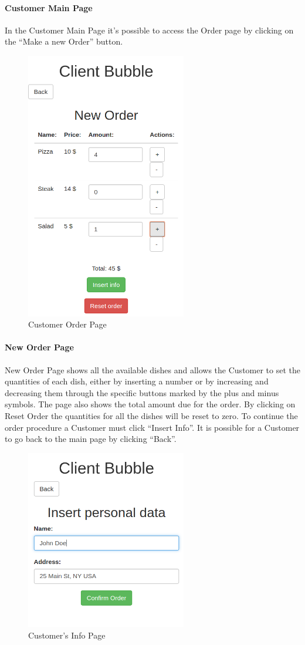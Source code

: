 \paragraph{Customer Main Page}
In the Customer Main Page it's possible to access the Order page by clicking on the ``Make a new Order'' button.
\begin{figure}[H]
	\centering
	\includegraphics[width=7cm]{../../documenti/UserManualDemo/demo_screens/client_dishes.png}
	\caption{Customer Order Page}
\end{figure}
\paragraph{New Order Page}
New Order Page shows all the available dishes and allows the Customer to set the quantities of each dish, either by inserting a number or by increasing and decreasing them through the specific buttons marked by the plus and minus symbols. The page also shows the total amount due for the order.
By clicking on Reset Order the quantities for all the dishes will be reset to zero.
To continue the order procedure a Customer must click ``Insert Info''. 
It is possible for a Customer to go back to the main page by clicking ``Back''.

\begin{figure}[H]
	\centering
	\includegraphics[width=7cm]{../../documenti/UserManualDemo/demo_screens/client_info.png}
	\caption{Customer's Info Page}
\end{figure}
